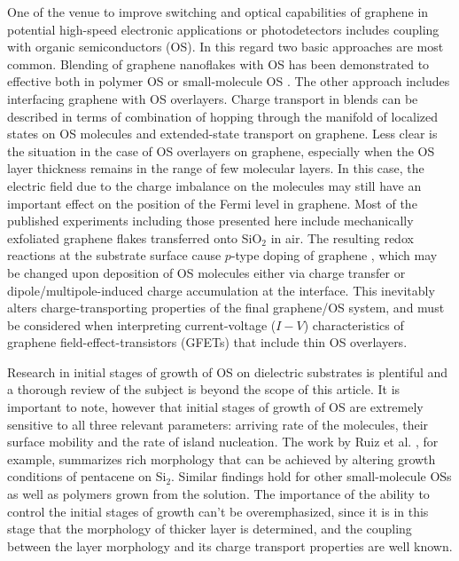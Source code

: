 \documentclass[preprint,aip,jap]{revtex4-2}
\begin{document}
One of the venue to improve switching and optical capabilities of graphene in potential high-speed electronic applications\cite{novoselov-2004} or photodetectors includes coupling with organic semiconductors (OS). In this regard  two basic approaches are most common. Blending of graphene nanoflakes with OS  has been demonstrated to effective both in polymer OS\cite{pathipati-2015,elgemayel-2014,liscio-2011} or small-molecule OS \cite{pathipati-2014}. The other approach includes interfacing graphene with OS overlayers\cite{pathipati-2019,pathipati-2015,huisman-2015,kim-2017b,ha-2012,zhou-2013a,nouchi-2008,nouchi-2014}. Charge transport in blends can be described in terms of combination of hopping through the manifold of localized states on OS molecules and extended-state transport on graphene. Less clear is the situation in the case of OS overlayers on graphene, especially when the OS layer thickness remains in the range of few molecular layers. In this case, the electric field due to the charge imbalance on the molecules may still have an important effect on the position of the Fermi level in graphene. Most of the published experiments including those presented here include mechanically exfoliated graphene flakes transferred onto SiO$_{2}$ in air. The resulting redox reactions at the substrate surface cause $p$-type doping of graphene \cite{feng-2014,peng-2017,lafkioti-2010}, which may be changed upon deposition of OS molecules either via charge transfer or dipole/multipole-induced charge accumulation at the interface. This inevitably alters charge-transporting properties of the final graphene/OS system, and must be considered when interpreting current-voltage ($I-V$) characteristics of graphene field-effect-transistors (GFETs) that include thin OS overlayers. 

Research in initial stages of growth of OS on dielectric substrates is plentiful and a thorough review of the subject is beyond the scope of this article. It is important to note, however that initial stages of growth of OS are extremely sensitive to all three relevant parameters: arriving rate of the molecules, their surface mobility and the rate of island nucleation. The work by Ruiz et al. \cite{ruiz-2004}, for example, summarizes rich morphology that can be achieved by altering growth conditions of pentacene on Si$_{2}$. Similar findings hold for other small-molecule OSs as well as polymers grown from the solution. The importance of the ability to control the initial stages of growth can't be overemphasized, since it is in this stage that the morphology of thicker layer is determined, and the coupling between the layer morphology and its charge transport properties are well known.
\end{document}
